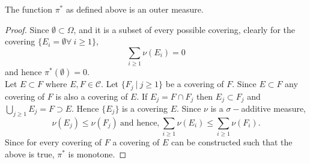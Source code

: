  \begin{proposition}\label{pro:outer}
   The function $\pi^*$ as defined above is an outer measure.
 \end{proposition}
 \begin{proof}
   Since $\emptyset \subset \Omega$, and it is a subset of every possible covering, clearly for the covering $\{E_i = \emptyset \forall\ i\geq 1\}$,
   \[\sum_{i\geq 1} \nu(E_i) = 0\]
   and hence $\pi^*(\emptyset) = 0$.\\

   Let $E\subset F$ where $E,F \in \mathscr{C}$. Let $\{F_j\ |\ j\geq 1\}$ be a covering of $F$. Since $E\subset F$ any covering of $F$ is also a covering of $E$. If $E_j = F\cap F_j$ then $E_j \subset F_j$ and $\bigcup_{j\geq 1}E_j = F \supset E$. Hence $\{E_j\}$ is a covering $E$. Since $\nu$ is a $\sigma-$additive measure,
   \[\nu(E_j) \leq \nu(F_j)\ \text{and hence,}\ \sum_{i\geq 1}\nu(E_i) \leq \sum_{i\geq 1}\nu(F_i).\]
   Since for every covering of $F$ a covering of $E$ can be constructed such that the above is true, $\pi^*$ is monotone. 
 \end{proof}
